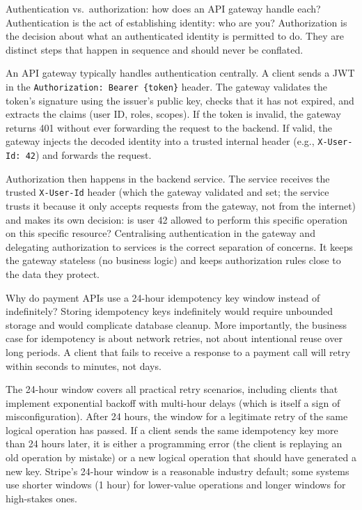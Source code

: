 \documentclass[11pt,a4paper]{article}
\begin{document}
\begin{curiobox}{Authentication vs.\ authorization: how does an API gateway handle each?}
Authentication is the act of establishing identity: who are you? Authorization is the decision about what an authenticated identity is permitted to do. They are distinct steps that happen in sequence and should never be conflated.

An API gateway typically handles authentication centrally. A client sends a JWT in the \texttt{Authorization: Bearer \{token\}} header. The gateway validates the token's signature using the issuer's public key, checks that it has not expired, and extracts the claims (user ID, roles, scopes). If the token is invalid, the gateway returns 401 without ever forwarding the request to the backend. If valid, the gateway injects the decoded identity into a trusted internal header (e.g., \texttt{X-User-Id: 42}) and forwards the request.

Authorization then happens in the backend service. The service receives the trusted \texttt{X-User-Id} header (which the gateway validated and set; the service trusts it because it only accepts requests from the gateway, not from the internet) and makes its own decision: is user 42 allowed to perform this specific operation on this specific resource? Centralising authentication in the gateway and delegating authorization to services is the correct separation of concerns. It keeps the gateway stateless (no business logic) and keeps authorization rules close to the data they protect.
\end{curiobox}

\begin{curiobox}{Why do payment APIs use a 24-hour idempotency key window instead of indefinitely?}
Storing idempotency keys indefinitely would require unbounded storage and would complicate database cleanup. More importantly, the business case for idempotency is about network retries, not about intentional reuse over long periods. A client that fails to receive a response to a payment call will retry within seconds to minutes, not days.

The 24-hour window covers all practical retry scenarios, including clients that implement exponential backoff with multi-hour delays (which is itself a sign of misconfiguration). After 24 hours, the window for a legitimate retry of the same logical operation has passed. If a client sends the same idempotency key more than 24 hours later, it is either a programming error (the client is replaying an old operation by mistake) or a new logical operation that should have generated a new key. Stripe's 24-hour window is a reasonable industry default; some systems use shorter windows (1 hour) for lower-value operations and longer windows for high-stakes ones.
\end{curiobox}
\end{document}
